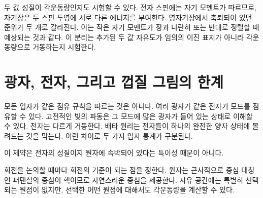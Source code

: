 두 값 성질이 각운동량인지도 시험할 수 있다. 전자 스핀에는 자기 모멘트가 따르므로, 자기장은 두 스핀 투영에 서로 다른 에너지를 부여한다. 영자기장에서 축퇴되어 있던 준위가 두 개로 갈라진다. 이는 작은 자기 모멘트가 장과 나란히 또는 반대로 정렬할 때 예상되는 것과 같다. 이 분리는 추가된 두 값 자유도가 임의의 이진 표지가 아니라 각운동량으로 거동하는지 시험한다.

\section{광자, 전자, 그리고 껍질 그림의 한계}

모든 입자가 같은 점유 규칙을 따르는 것은 아니다. 여러 광자가 같은 전자기 모드를 점유할 수 있다. 고전적인 빛의 파동은 그 모드에 많은 광자가 들어 있는 상태로 이해할 수 있다. 전자는 다르게 거동한다. 배타 원리는 전자들이 하나의 완전한 양자 상태에 몰려드는 것을 막는다. 이런 차이로 두 가지 입자 통계가 구분된다.

\begin{classroomqa}
\end{classroomqa}

이 제약은 전자의 성질이지 원자에 속박되어 있다는 특이성 때문이 아니다.

\begin{classroomqa}
\end{classroomqa}

회전을 논의할 때마다 회전의 기준이 되는 점을 정한다. 원자는 근사적으로 중심 대칭인 퍼텐셜의 중심이 핵이므로 자연스러운 중심을 제공한다. 자유 공간에는 특별히 선택되는 원점이 없지만, 선택한 어떤 원점에 대해서도 각운동량을 계산할 수 있다.

\begin{classroomqa}
\end{classroomqa}

